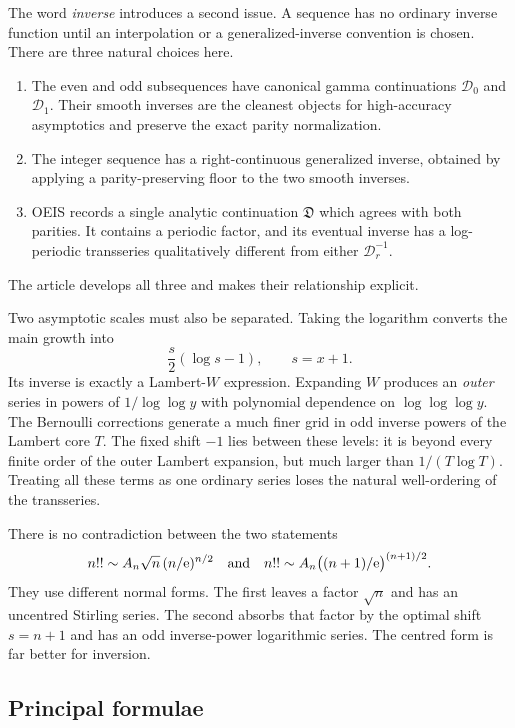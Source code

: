 \documentclass[11pt,a4paper,oneside]{article}
\theoremstyle{plain}
\theoremstyle{definition}
\theoremstyle{remark}
\newcommand{\e}{\mathrm e}
\newcommand{\D}{\mathcal D}
\newcommand{\DO}{\mathfrak D}
\begin{document}
The word \emph{inverse} introduces a second issue.  A sequence has no ordinary
inverse function until an interpolation or a generalized-inverse convention is
chosen.  There are three natural choices here.
\begin{enumerate}
\item The even and odd subsequences have canonical gamma continuations
      $\D_0$ and $\D_1$.  Their smooth inverses are the cleanest objects for
      high-accuracy asymptotics and preserve the exact parity normalization.
\item The integer sequence has a right-continuous generalized inverse, obtained
      by applying a parity-preserving floor to the two smooth inverses.
\item OEIS records a single analytic continuation $\DO$ which agrees with both
      parities.  It contains a periodic factor, and its eventual inverse has a
      log-periodic transseries qualitatively different from either $\D_r^{-1}$.
\end{enumerate}
The article develops all three and makes their relationship explicit.

Two asymptotic scales must also be separated.  Taking the logarithm converts
the main growth into
\[
 \frac{s}{2}(\log s-1),\qquad s=x+1.
\]
Its inverse is exactly a Lambert-$W$ expression.  Expanding $W$ produces an
\emph{outer} series in powers of $1/\log\log y$ with polynomial dependence on
$\log\log\log y$.  The Bernoulli corrections generate a much finer grid in
odd inverse powers of the Lambert core $T$.  The fixed shift $-1$ lies between
these levels: it is beyond every finite order of the outer Lambert expansion,
but much larger than $1/(T\log T)$.  Treating all these terms as one ordinary
series loses the natural well-ordering of the transseries.

\begin{warningbox}
There is no contradiction between the two statements
\[
 n!!\sim A_n\sqrt n\,(n/\e)^{n/2}
 \quad\hbox{and}\quad
 n!!\sim A_n\bigl((n+1)/\e\bigr)^{(n+1)/2}.
\]
They use different normal forms.  The first leaves a factor $\sqrt n$ and has
an uncentred Stirling series.  The second absorbs that factor by the optimal
shift $s=n+1$ and has an odd inverse-power logarithmic series.  The centred
form is far better for inversion.
\end{warningbox}

\subsection{Principal formulae}
\end{document}
